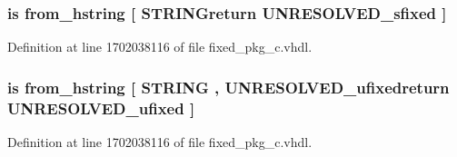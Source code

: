 \hypertarget{classfixed__pkg_a77fc6c4053e07d7a80d3450a6d2b06d6}{}
\subsubsection[{from\+\_\+hex\+\_\+string}]{ {\bfseries \textcolor{keywordflow}{is}\textcolor{vhdlchar}{ }\textcolor{vhdlchar}{from\+\_\+hstring}\textcolor{vhdlchar}{ }\textcolor{vhdlchar}{\mbox{[}}\textcolor{vhdlchar}{ }\textcolor{vhdlchar}{S\+T\+R\+I\+N\+Greturn}\textcolor{vhdlchar}{ }{\bfseries {\bf U\+N\+R\+E\+S\+O\+L\+V\+E\+D\+\_\+sfixed}} \textcolor{vhdlchar}{ }\textcolor{vhdlchar}{\mbox{]}}\textcolor{vhdlchar}{ }} \hspace{0.3cm}{\ttfamily [Alias]}}\label{classfixed__pkg_a77fc6c4053e07d7a80d3450a6d2b06d6}


Definition at line 1702038116 of file fixed\+\_\+pkg\+\_\+c.\+vhdl.

\hypertarget{classfixed__pkg_a724add031b8c0ffca95ef99b617b552c}{}
\subsubsection[{from\+\_\+hex\+\_\+string}]{ {\bfseries \textcolor{keywordflow}{is}\textcolor{vhdlchar}{ }\textcolor{vhdlchar}{from\+\_\+hstring}\textcolor{vhdlchar}{ }\textcolor{vhdlchar}{\mbox{[}}\textcolor{vhdlchar}{ }\textcolor{comment}{S\+T\+R\+I\+N\+G}\textcolor{vhdlchar}{ }\textcolor{vhdlchar}{,}\textcolor{vhdlchar}{ }\textcolor{vhdlchar}{U\+N\+R\+E\+S\+O\+L\+V\+E\+D\+\_\+ufixedreturn}\textcolor{vhdlchar}{ }{\bfseries {\bf U\+N\+R\+E\+S\+O\+L\+V\+E\+D\+\_\+ufixed}} \textcolor{vhdlchar}{ }\textcolor{vhdlchar}{\mbox{]}}\textcolor{vhdlchar}{ }} \hspace{0.3cm}{\ttfamily [Alias]}}\label{classfixed__pkg_a724add031b8c0ffca95ef99b617b552c}


Definition at line 1702038116 of file fixed\+\_\+pkg\+\_\+c.\+vhdl.

\hypertarget{classfixed__pkg_a03b95d27d5faeed595b531a2333e9947}{}
